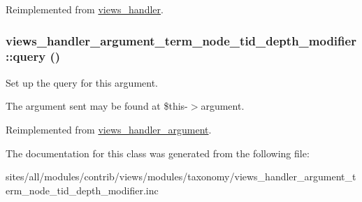 Reimplemented from \hyperlink{classviews__handler_4eeb5551d6c97b1ea074049991989fce}{views\_\-handler}.\hypertarget{classviews__handler__argument__term__node__tid__depth__modifier_13fb3ff5466a1c9fcd863bb4962a18c8}{
\subsubsection[{query}]{\setlength{\rightskip}{0pt plus 5cm}views\_\-handler\_\-argument\_\-term\_\-node\_\-tid\_\-depth\_\-modifier::query ()}}
\label{classviews__handler__argument__term__node__tid__depth__modifier_13fb3ff5466a1c9fcd863bb4962a18c8}


Set up the query for this argument.

The argument sent may be found at \$this-$>$argument. 

Reimplemented from \hyperlink{classviews__handler__argument_c4b0ce6704a10f515b2aea2f9e790994}{views\_\-handler\_\-argument}.

The documentation for this class was generated from the following file:\begin{CompactItemize}
\item 
sites/all/modules/contrib/views/modules/taxonomy/views\_\-handler\_\-argument\_\-term\_\-node\_\-tid\_\-depth\_\-modifier.inc\end{CompactItemize}

